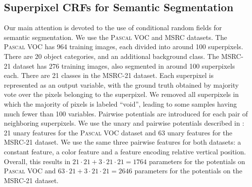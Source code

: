 \subsection{Superpixel CRFs for Semantic Segmentation}
Our main attention is devoted to the use of conditional random fields for
semantic segmentation.  We use the \textsc{Pascal VOC} and MSRC datasets.
The \textsc{Pascal VOC} has 964 training images, each divided into
around 100 superpixels. There are 20 object categories, and an additional background class. The %
MSRC-21 dataset has 276 training images, also segmented in around 100 superpixels
each. There are 21 classes in the MSRC-21 dataset.
Each superpixel is represented as an output variable, with the ground truth
obtained by majority vote over the pixels belonging to the superpixel. We
removed all superpixels in which the majority of pixels is labeled ``void'', leading to some samples
having much fewer than 100 variables.
Pairwise potentials are introduced for each pair of neighboring superpixels.
We use the unary and pairwise potentials described in :
21 unary features for the \textsc{Pascal VOC} dataset and 63 unary features for the MSRC-21 dataset.
We use the same three pairwise features for both datasets: a constant feature, a color
feature and a feature encoding relative vertical position.
Overall, this results in $21 \cdot  21 + 3 \cdot 21 \cdot 21 = 1764$ parameters
for the potentials on \textsc{Pascal VOC} and $63 \cdot  21 + 3 \cdot 21 \cdot 21 =
2646$ parameters for the potentials on the MSRC-21 dataset.


